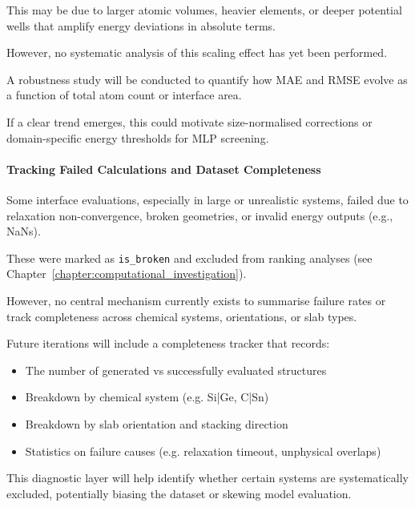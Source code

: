 This may be due to larger atomic volumes, heavier elements, or deeper potential wells that amplify energy deviations in
absolute terms.

However, no systematic analysis of this scaling effect has yet been performed.


A robustness study will be conducted to quantify how MAE and RMSE evolve as a function of total atom count or interface
area.

If a clear trend emerges, this could motivate size-normalised corrections or domain-specific energy thresholds for MLP
screening.




\paragraph{Tracking Failed Calculations and Dataset Completeness}


Some interface evaluations, especially in large or unrealistic systems, failed due to relaxation non-convergence, broken
geometries, or invalid energy outputs (e.g., NaNs).

These were marked as \texttt{is\_broken} and excluded from ranking analyses (see
Chapter~\ref{chapter:computational_investigation}).

However, no central mechanism currently exists to summarise failure rates or track completeness across chemical systems,
orientations, or slab types.


Future iterations will include a completeness tracker that records:


\begin{itemize}
    \item The number of generated vs successfully evaluated structures
    \item Breakdown by chemical system (e.g. Si|Ge, C|Sn)
    \item Breakdown by slab orientation and stacking direction
    \item Statistics on failure causes (e.g. relaxation timeout, unphysical overlaps)
\end{itemize}


This diagnostic layer will help identify whether certain systems are systematically excluded, potentially biasing the
dataset or skewing model evaluation.

